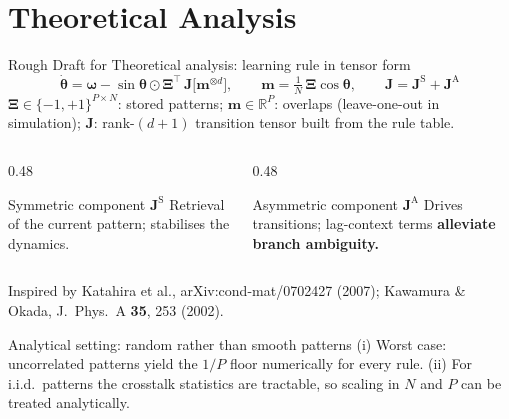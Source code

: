 \documentclass[aspectratio=169]{beamer}
\newcommand{\thetavar}{\theta}
\begin{document}
\section[Analysis]{Theoretical Analysis}

\begin{frame}{Rough Draft for Theoretical analysis: learning rule in tensor form}
  \small
  \[
    \dot{\boldsymbol{\thetavar}} = \boldsymbol{\omega} - \sin\boldsymbol{\thetavar} \odot
      \boldsymbol{\Xi}^{\top}\,\mathbf{J}\bigl[\mathbf{m}^{\otimes d}\bigr],
    \qquad
    \mathbf{m} = \tfrac{1}{N}\,\boldsymbol{\Xi}\cos\boldsymbol{\thetavar},
    \qquad
    \mathbf{J} = \mathbf{J}^{\mathrm{S}} + \mathbf{J}^{\mathrm{A}}
  \]
  {\footnotesize $\boldsymbol{\Xi} \in \{-1,+1\}^{P\times N}$: stored patterns;
  $\mathbf{m} \in \mathbb{R}^{P}$: overlaps (leave-one-out in simulation);
  $\mathbf{J}$: rank-$(d{+}1)$ transition tensor built from the rule table.}
  \vspace{2mm}
  \begin{columns}[T]
    \begin{column}{0.48\textwidth}
      \begin{block}{Symmetric component $\mathbf{J}^{\mathrm{S}}$}
        \footnotesize
        Retrieval of the current pattern; stabilises the dynamics. 
      \end{block}
    \end{column}
    \begin{column}{0.48\textwidth}
      \begin{block}{Asymmetric component $\mathbf{J}^{\mathrm{A}}$}
        \footnotesize
        Drives transitions; lag-context terms \textbf{alleviate branch ambiguity.}
      \end{block}
    \end{column}
  \end{columns}
  \vspace{2mm}
  {\footnotesize Inspired by Katahira et al., arXiv:cond-mat/0702427 (2007);
  Kawamura \& Okada, J.\ Phys.\ A \textbf{35}, 253 (2002).}
  \vspace{2mm}
  \begin{block}{Analytical setting: random rather than smooth patterns}
    \footnotesize
    (i) Worst case: uncorrelated patterns yield the $1/P$ floor numerically for every rule.
    (ii) For i.i.d.\ patterns the crosstalk statistics are tractable, so scaling in $N$ and $P$
    can be treated analytically. 
  \end{block}
\end{frame}
\end{document}

